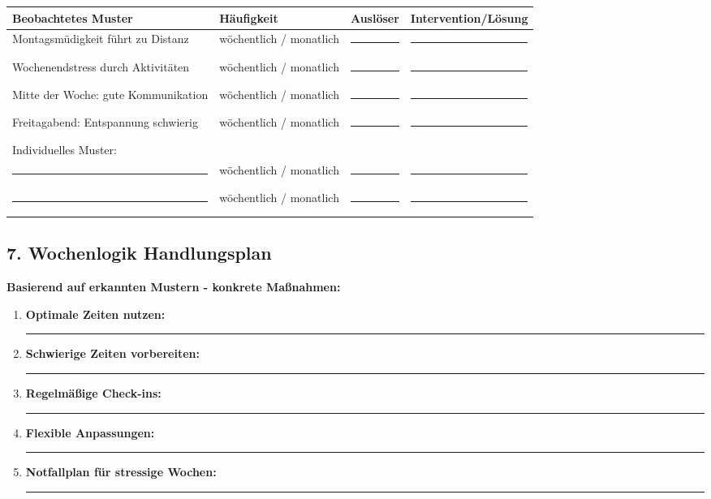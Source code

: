 {\begin{center}
\begin{tabular}{|p{3cm}|p{3cm}|p{3cm}|p{4cm}|}
\hline
\textbf{Beobachtetes Muster} & \textbf{Häufigkeit} & \textbf{Auslöser} & \textbf{Intervention/Lösung} \\
\hline
Montagsmüdigkeit führt zu Distanz & wöchentlich / monatlich & \rule{2.5cm}{0.4pt} & \rule{3.5cm}{0.4pt} \\
\hline
Wochenendstress durch Aktivitäten & wöchentlich / monatlich & \rule{2.5cm}{0.4pt} & \rule{3.5cm}{0.4pt} \\
\hline
Mitte der Woche: gute Kommunikation & wöchentlich / monatlich & \rule{2.5cm}{0.4pt} & \rule{3.5cm}{0.4pt} \\
\hline
Freitagabend: Entspannung schwierig & wöchentlich / monatlich & \rule{2.5cm}{0.4pt} & \rule{3.5cm}{0.4pt} \\
\hline
Individuelles Muster: & & & \\
\rule{2.5cm}{0.4pt} & wöchentlich / monatlich & \rule{2.5cm}{0.4pt} & \rule{3.5cm}{0.4pt} \\
\hline
\rule{2.5cm}{0.4pt} & wöchentlich / monatlich & \rule{2.5cm}{0.4pt} & \rule{3.5cm}{0.4pt} \\
\hline
\end{tabular}
\end{center}

\hypertarget{wochenlogik-handlungsplan}{%
\subsection{7. Wochenlogik Handlungsplan}}\label{wochenlogik-handlungsplan}

\textbf{Basierend auf erkannten Mustern - konkrete Maßnahmen:}

\begin{enumerate}
\def\labelenumi{\arabic{enumi}.}
\tightlist
\item
  \textbf{Optimale Zeiten nutzen:} \rule{8cm}{0.4pt}
\item
  \textbf{Schwierige Zeiten vorbereiten:} \rule{8cm}{0.4pt}
\item
  \textbf{Regelmäßige Check-ins:} \rule{8cm}{0.4pt}
\item
  \textbf{Flexible Anpassungen:} \rule{8cm}{0.4pt}
\item
  \textbf{Notfallplan für stressige Wochen:} \rule{8cm}{0.4pt}
\end{enumerate}

\hypertarget{navigation-und-verweise-wochenlogik}{%
}}
